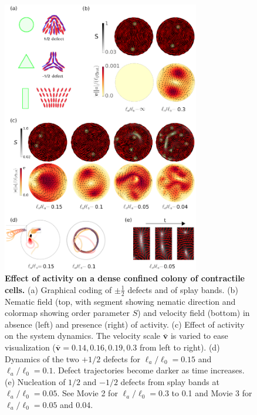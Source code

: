 \documentclass[12pt]{iopart}
\begin{document}
	\begin{figure}[tb]
		\centering
		\includegraphics[width=0.77\textwidth]{fig4.eps}
		\caption{\label{sec_1_chap_3_fig_3.5}  \textbf{Effect of activity on a dense confined colony of contractile cells.} (a) Graphical coding of $\pm \frac{1}{2}$ defects and of splay bands. (b) Nematic field (top, with segment showing nematic direction and colormap showing order parameter $S$) and velocity field (bottom) in absence (left) and presence (right) of activity.	(c) Effect of activity on the system dynamics. The velocity scale $\bar{\bm{v}}$ is varied to ease visualization ($\bar{\bm{v}} = 0.14, 0.16, 0.19, 0.3$ from left to right). (d) Dynamics of the two $+1/2$ defects for $\ell_a/\ell_0=0.15$ and $\ell_a/\ell_0=0.1$. Defect trajectories become darker as time increases. (e) Nucleation of $1/2$ and  $-1/2$ defects from splay bands at $\ell_a/\ell_0=0.05$. See Movie 2 for $\ell_a/\ell_0=0.3$ to 0.1 and Movie 3 for $\ell_a/\ell_0=0.05$ and 0.04. }
	\end{figure}
	
\end{document}
